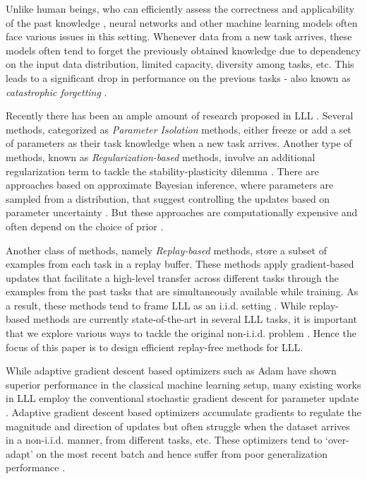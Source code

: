\documentclass{article} \usepackage{collas2022_conference,times}
\begin{document}
    Unlike human beings, who can efficiently assess the correctness and applicability of the past knowledge \citep{chen2018lifelong}, neural networks and other machine learning models often face various issues in this setting. Whenever data from a new task arrives, these models often tend to forget the previously obtained knowledge due to dependency on the input data distribution, limited capacity, diversity among tasks, etc. This leads to a significant drop in performance on the previous tasks - also known as \textit{catastrophic forgetting}
\citep{MCCLOSKEY1989109,323080,xie2021artificial}.
    
    Recently there has been an ample amount of research proposed in LLL \citep{delange2021continual}. Several methods, categorized as \textit{Parameter Isolation} methods, either freeze or add a set of parameters as their task knowledge when a new task arrives. Another type of methods, known as \textit{Regularization-based} methods, involve an additional regularization term to tackle the stability-plasticity dilemma \citep{kirkpatrick2017overcoming,li2021lifelong}. There are approaches based on approximate Bayesian inference, where parameters are sampled from a distribution, that suggest controlling the updates based on parameter uncertainty \citep{blundell2015weight,adel2019continual,ahn2019uncertainty}. But these approaches are computationally expensive and often depend on the choice of prior \citep{zenke2017continual,nguyen2018variational}. 

   






    Another class of methods, namely \textit{Replay-based} methods, store a subset of examples from each task in a replay buffer. These methods apply gradient-based updates that facilitate a high-level transfer across different tasks through the examples from the past tasks that are simultaneously available while training. As a result, these methods tend to frame LLL as an i.i.d. setting \citep{bang2021rainbow,saha2021gradient}. While replay-based methods are currently state-of-the-art in several LLL tasks, it is important that we explore various ways to tackle the original non-i.i.d. problem \citep{HADSELL20201028}. Hence the focus of this paper is to design efficient replay-free methods for LLL.


    While adaptive gradient descent based optimizers such as Adam \citep{kingma2014adam} have shown superior performance in the classical machine learning setup, many existing works in LLL employ the conventional stochastic gradient descent for parameter update \citep{lopez2017gradient,chaudhry2019tiny,farajtabar2020orthogonal}. Adaptive gradient descent based optimizers accumulate gradients to regulate the magnitude and direction of updates but often struggle when the dataset arrives in a non-i.i.d. manner, from different tasks, etc. These optimizers tend to `over-adapt' on the most recent batch and hence suffer from poor generalization performance \citep{keskar2017improving, chen2018closing, mirzadeh2020understanding}. 
\end{document}
